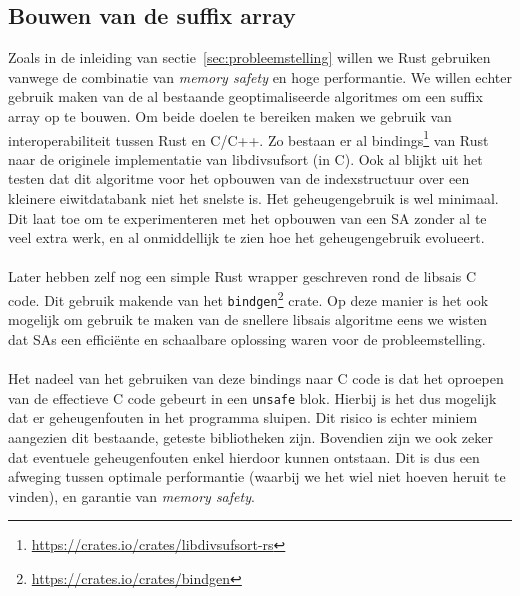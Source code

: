 \subsection{Bouwen van de suffix array}\label{subsec:bouwen-van-de-suffix-array}
Zoals in de inleiding van sectie~\ref{sec:probleemstelling} willen we Rust gebruiken vanwege de combinatie van \textit{memory safety} en hoge performantie.
We willen echter gebruik maken van de al bestaande geoptimaliseerde algoritmes om een suffix array op te bouwen.
Om beide doelen te bereiken maken we gebruik van interoperabiliteit tussen Rust en C/C++.
Zo bestaan er al bindings\footnote{\url{https://crates.io/crates/libdivsufsort-rs}} van Rust naar de originele implementatie van libdivsufsort\cite{libdivsufsort} (in C).
Ook al blijkt uit het testen dat dit algoritme voor het opbouwen van de indexstructuur over een kleinere eiwitdatabank niet het snelste is.
Het geheugengebruik is wel minimaal.
Dit laat toe om te experimenteren met het opbouwen van een SA zonder al te veel extra werk, en al onmiddellijk te zien hoe het geheugengebruik evolueert.
\\ \\
Later hebben zelf nog een simple Rust wrapper geschreven rond de libsais C code.
Dit gebruik makende van het \texttt{bindgen}\footnote{\url{https://crates.io/crates/bindgen}} crate.
Op deze manier is het ook mogelijk om gebruik te maken van de snellere libsais algoritme eens we wisten dat SAs een efficiënte en schaalbare oplossing waren voor de probleemstelling.
\\ \\
Het nadeel van het gebruiken van deze bindings naar C code is dat het oproepen van de effectieve C code gebeurt in een \texttt{unsafe} blok.
Hierbij is het dus mogelijk dat er geheugenfouten in het programma sluipen.
Dit risico is echter miniem aangezien dit bestaande, geteste bibliotheken zijn.
Bovendien zijn we ook zeker dat eventuele geheugenfouten enkel hierdoor kunnen ontstaan.
Dit is dus een afweging tussen optimale performantie (waarbij we het wiel niet hoeven heruit te vinden), en garantie van \textit{memory safety}.

